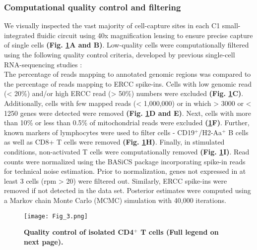 \subsubsection*{Computational quality control and filtering}

We visually inspected the vast majority of cell-capture sites in each C1 small-integrated fluidic circuit using 40x magnification lensing to ensure precise capture of single cells \textbf{(Fig. \ref{fig1:QC}A and B)}. Low-quality cells were computationally filtered using the following quality control criteria, developed by previous single-cell RNA-sequencing studies \citep{Brennecke2013, Buettner2015, Scialdone2015, Vallejos2015BASiCS}:\\
The percentage of reads mapping to annotated genomic regions was compared to the percentage of reads mapping to ERCC spike-ins. Cells with low genomic read (< 20\%) and/or high ERCC read (> 50\%) numbers were excluded \textbf{(Fig. \ref{fig1:QC}C)}. Additionally, cells with few mapped reads (< 1,000,000) or in which > 3000 or < 1250 genes were detected were removed \textbf{(Fig. \ref{fig1:QC}D and E)}. Next, cells with more than 10\% or less than 0.5\% of mitochondrial reads were excluded \textbf{(\ref{fig1:QC}F)}. Further, known markers of lymphocytes were used to filter cells - CD19$^+$/H2-Aa$^+$ B cells as well as CD8+ T cells were removed \textbf{(Fig. \ref{fig1:QC}H)}. Finally, in stimulated conditions, non-activated T cells were computationally removed \textbf{(Fig. \ref{fig1:QC}I)}. Read counts were normalized using the BASiCS package \citep{Vallejos2015} incorporating spike-in reads for technical noise estimation. Prior to normalization, genes not expressed in at least 3 cells (rpm > 20) were filtered out. Similarly, ERCC spike-ins were removed if not detected in the data set. Posterior estimates were computed using a Markov chain Monte Carlo (MCMC) simulation with 40,000 iterations.  

\begin{figure}[!hb]
\centering
\texttt{[image: Fig\_3.png]}
\caption[Quality control of isolated CD4$^+$ T cells]{\textbf{Quality control of isolated CD4$^+$ T cells (Full legend on next page).}}
\label{fig1:QC}
\end{figure}

\newpage

